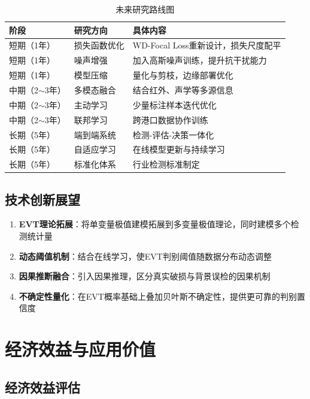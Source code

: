 \documentclass[12pt,a4paper]{ctexart}
\theoremstyle{cumcm}
\begin{document}
\begin{table}[H]
\centering
{}
\caption{未来研究路线图}
\begin{tabularx}{\textwidth}{lXX}
\toprule
\textbf{阶段} & \textbf{研究方向} & \textbf{具体内容} \\
\midrule
短期（1年） & 损失函数优化 & WD-Focal Loss重新设计，损失尺度配平 \\
短期（1年） & 噪声增强 & 加入高斯噪声训练，提升抗干扰能力 \\
短期（1年） & 模型压缩 & 量化与剪枝，边缘部署优化 \\
\midrule
中期（2$\sim$3年） & 多模态融合 & 结合红外、声学等多源信息 \\
中期（2$\sim$3年） & 主动学习 & 少量标注样本迭代优化 \\
中期（2$\sim$3年） & 联邦学习 & 跨港口数据协作训练 \\
\midrule
长期（5年） & 端到端系统 & 检测-评估-决策一体化 \\
长期（5年） & 自适应学习 & 在线模型更新与持续学习 \\
长期（5年） & 标准化体系 & 行业检测标准制定 \\
\bottomrule
\end{tabularx}
\end{table}

\subsection{技术创新展望}

\begin{enumerate}[leftmargin=2.2em,itemsep=2pt]
\item \textbf{EVT理论拓展}：将单变量极值建模拓展到多变量极值理论，同时建模多个检测统计量
\item \textbf{动态阈值机制}：结合在线学习，使EVT判别阈值随数据分布动态调整
\item \textbf{因果推断融合}：引入因果推理，区分真实破损与背景误检的因果机制
\item \textbf{不确定性量化}：在EVT概率基础上叠加贝叶斯不确定性，提供更可靠的判别置信度
\end{enumerate}

\section{经济效益与应用价值}

\subsection{经济效益评估}
\end{document}
